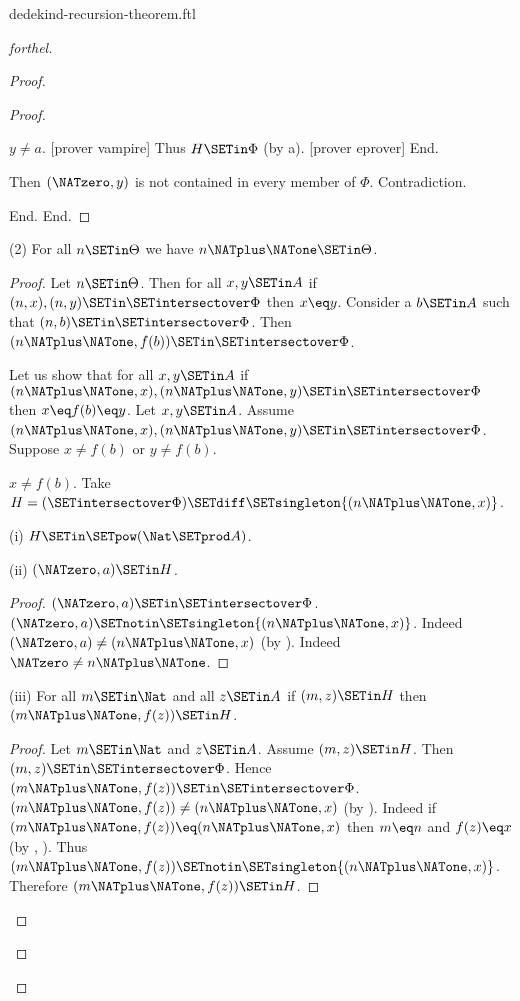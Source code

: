 \documentclass{naproche-library}
\begin{document}
\begin{smodule}[title=Dedekind's Recursion Theorem]{dedekind-recursion-theorem.ftl}
\begin{proof}[forthel]
\begin{proof}
\begin{proof}
\begin{case}{$y \neq a$.}
              [prover vampire]
              Thus $H \SETin \Phi$ (by a).
              [prover eprover]
            End.

            Then $(\NATzero,y)$ is not contained in every member of $\Phi$.
            Contradiction.
          \end{case}
        End.
      End.
    \end{proof}

    (2) For all $n \SETin \Theta$ we have $n \NATplus \NATone \SETin \Theta$.
    \begin{proof}
      Let $n \SETin \Theta$.
      Then for all $x, y \SETin A$ if $(n, x), (n, y) \SETin \SETintersectover \Phi$ then
      $x \eq y$.
      Consider a $b \SETin A$ such that $(n,b) \SETin \SETintersectover \Phi$.
      Then $(n \NATplus \NATone, f(b)) \SETin \SETintersectover \Phi$.

      Let us show that for all $x, y \SETin A$ if $(n \NATplus \NATone, x),
      (n \NATplus \NATone, y) \SETin \SETintersectover \Phi$ then $x \eq f(b) \eq y$.
        Let $x, y \SETin A$.
        Assume $(n \NATplus \NATone, x), (n \NATplus \NATone, y) \SETin \SETintersectover \Phi$.
        Suppose $x \neq f(b)$ or $y \neq f(b)$.

        \begin{case}{$x \neq f(b)$.}
          Take $H = (\SETintersectover \Phi) \SETdiff \SETsingleton{(n \NATplus \NATone,x)}$.

          (i) $H \SETin \SETpow(\Nat \SETprod A)$.

          (ii) $(\NATzero,a) \SETin H$.
          \begin{proof}
            $(\NATzero,a) \SETin \SETintersectover \Phi$.
            $(\NATzero,a) \SETnotin \SETsingleton{(n \NATplus \NATone,x)}$.
            Indeed $(\NATzero,a) \neq (n \NATplus \NATone,x)$ (by ).
            Indeed $\NATzero \neq n \NATplus \NATone$.
          \end{proof}

          (iii) For all $m \SETin \Nat$ and all $z \SETin A$ if $(m,z) \SETin H$ then $(m \NATplus \NATone,f(z)) \SETin H$.
          \begin{proof}
            Let $m \SETin \Nat$ and $z \SETin A$.
            Assume $(m,z) \SETin H$.
            Then $(m,z) \SETin \SETintersectover \Phi$.
            Hence $(m \NATplus \NATone,f(z)) \SETin \SETintersectover \Phi$.
            $(m \NATplus \NATone,f(z)) \neq (n \NATplus \NATone,x)$ (by ).
            Indeed if $(m \NATplus \NATone,f(z)) \eq (n \NATplus \NATone,x)$ then $m \eq n$ and $f(z) \eq x$ (by , ).
            Thus $(m \NATplus \NATone,f(z)) \SETnotin \SETsingleton{(n \NATplus \NATone,x)}$.
            Therefore $(m \NATplus \NATone,f(z)) \SETin H$.
          \end{proof}


\end{case}
\end{proof}
\end{proof}
\end{proof}
\end{smodule}
\end{document}
